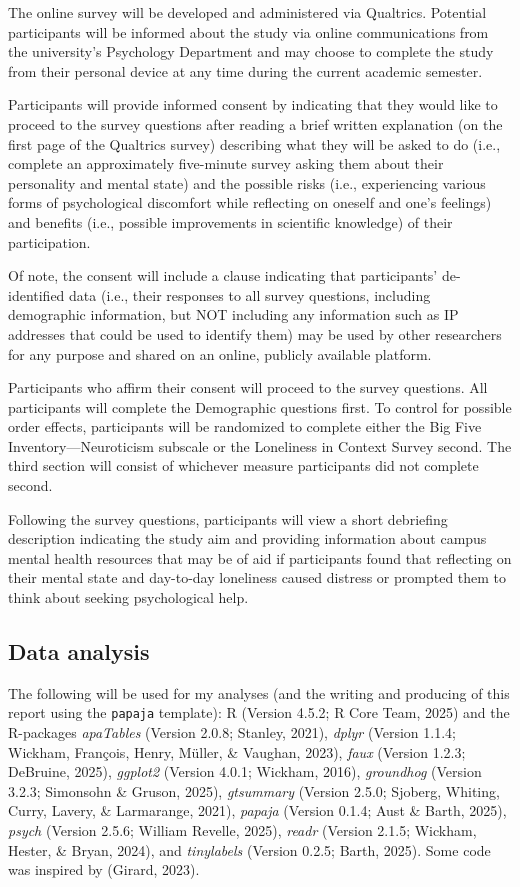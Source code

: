 \documentclass[
  english,
  man]{apa6}
\begin{document}
The online survey will be developed and administered via Qualtrics. Potential participants will be informed about the study via online communications from the university's Psychology Department and may choose to complete the study from their personal device at any time during the current academic semester.

Participants will provide informed consent by indicating that they would like to proceed to the survey questions after reading a brief written explanation (on the first page of the Qualtrics survey) describing what they will be asked to do (i.e., complete an approximately five-minute survey asking them about their personality and mental state) and the possible risks (i.e., experiencing various forms of psychological discomfort while reflecting on oneself and one's feelings) and benefits (i.e., possible improvements in scientific knowledge) of their participation.

Of note, the consent will include a clause indicating that participants' de-identified data (i.e., their responses to all survey questions, including demographic information, but NOT including any information such as IP addresses that could be used to identify them) may be used by other researchers for any purpose and shared on an online, publicly available platform.

Participants who affirm their consent will proceed to the survey questions. All participants will complete the Demographic questions first. To control for possible order effects, participants will be randomized to complete either the Big Five Inventory---Neuroticism subscale or the Loneliness in Context Survey second. The third section will consist of whichever measure participants did not complete second.

Following the survey questions, participants will view a short debriefing description indicating the study aim and providing information about campus mental health resources that may be of aid if participants found that reflecting on their mental state and day-to-day loneliness caused distress or prompted them to think about seeking psychological help.

\subsection{Data analysis}\label{data-analysis}

The following will be used for my analyses (and the writing and producing of this report using the \texttt{papaja} template): R (Version 4.5.2; R Core Team, 2025) and the R-packages \emph{apaTables} (Version 2.0.8; Stanley, 2021), \emph{dplyr} (Version 1.1.4; Wickham, François, Henry, Müller, \& Vaughan, 2023), \emph{faux} (Version 1.2.3; DeBruine, 2025), \emph{ggplot2} (Version 4.0.1; Wickham, 2016), \emph{groundhog} (Version 3.2.3; Simonsohn \& Gruson, 2025), \emph{gtsummary} (Version 2.5.0; Sjoberg, Whiting, Curry, Lavery, \& Larmarange, 2021), \emph{papaja} (Version 0.1.4; Aust \& Barth, 2025), \emph{psych} (Version 2.5.6; William Revelle, 2025), \emph{readr} (Version 2.1.5; Wickham, Hester, \& Bryan, 2024), and \emph{tinylabels} (Version 0.2.5; Barth, 2025). Some code was inspired by (Girard, 2023).
\end{document}
